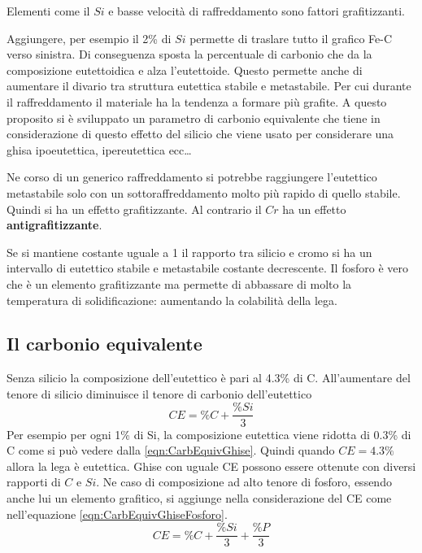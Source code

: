 Elementi come il $Si$ e basse velocità di raffreddamento sono fattori grafitizzanti.


Aggiungere, per esempio il 2\% di $Si$ permette di traslare tutto il grafico Fe-C verso sinistra. Di conseguenza sposta la percentuale di carbonio che da la composizione eutettoidica e alza l'eutettoide.
Questo permette anche di aumentare il divario tra struttura eutettica stabile e metastabile. Per cui durante il raffreddamento il materiale ha la tendenza a formare più grafite.
A questo proposito si è sviluppato un parametro di carbonio equivalente che tiene in considerazione di questo effetto del silicio che viene usato per considerare una ghisa ipoeutettica, ipereutettica ecc\dots

Ne corso di un generico raffreddamento si potrebbe raggiungere l'eutettico metastabile solo con un sottoraffreddamento molto più rapido di quello stabile. Quindi si ha un effetto grafitizzante.
Al contrario il $Cr$ ha un effetto \textbf{antigrafitizzante}.

Se si mantiene costante uguale a 1 il rapporto tra silicio e cromo si ha un intervallo di eutettico stabile e metastabile costante decrescente.
Il fosforo è vero che è un elemento grafitizzante ma permette di abbassare di molto la temperatura di solidificazione: aumentando la colabilità della lega.

\subsection{Il carbonio equivalente}
Senza silicio la composizione dell'eutettico è pari al 4.3\% di C. 
All'aumentare del tenore di silicio diminuisce il tenore di carbonio dell'eutettico
\begin{equation}
CE = \%C + \frac{\%Si}{3}
\label{eqn:CarbEquivGhise}
\end{equation}
Per esempio per ogni 1\% di Si, la composizione eutettica viene ridotta di 0.3\% di C come si può vedere dalla \eqref{eqn:CarbEquivGhise}.
Quindi quando $CE = 4.3\%$ allora la lega è eutettica. Ghise con uguale CE possono essere ottenute con diversi rapporti di $C$ e $Si$.
Ne caso di composizione ad alto tenore di fosforo, essendo anche lui un elemento grafitico, si aggiunge nella considerazione del CE come nell'equazione \eqref{eqn:CarbEquivGhiseFosforo}.
\begin{equation}
CE = \%C + \frac{\%Si}{3} + \frac{\%P}{3}
\label{eqn:CarbEquivGhiseFosforo}
\end{equation}

